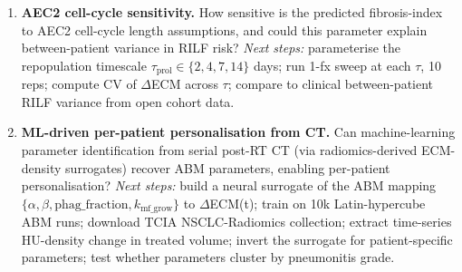 \begin{enumerate}
  \item \textbf{AEC2 cell-cycle sensitivity.} How sensitive is the
    predicted fibrosis-index to AEC2 cell-cycle length assumptions,
    and could this parameter explain between-patient variance in RILF
    risk?
    \emph{Next steps:} parameterise the repopulation timescale
    $\tau_{\mathrm{prol}} \in \{2,4,7,14\}$ days; run 1-fx sweep at each
    $\tau$, 10 reps; compute CV of $\Delta$ECM across $\tau$;
    compare to clinical between-patient RILF variance from open cohort
    data.

  \item \textbf{ML-driven per-patient personalisation from CT.} Can
    machine-learning parameter identification from serial post-RT CT
    (via radiomics-derived ECM-density surrogates) recover ABM
    parameters, enabling per-patient personalisation?
    \emph{Next steps:} build a neural surrogate of the ABM mapping
    $\{\alpha,\beta,\mathrm{phag\_fraction},k_{\mathrm{mf\_grow}}\}$ to
    $\Delta$ECM(t); train on 10k Latin-hypercube ABM runs; download
    TCIA NSCLC-Radiomics collection; extract time-series HU-density
    change in treated volume; invert the surrogate for patient-specific
    parameters; test whether parameters cluster by pneumonitis grade.
\end{enumerate}
